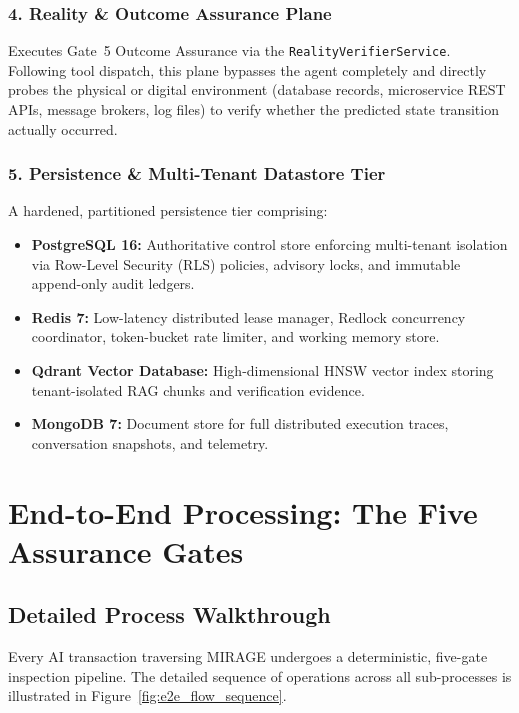 \documentclass[11pt,a4paper]{article}
\begin{document}
\subsubsection{4. Reality \& Outcome Assurance Plane}
Executes Gate~5 Outcome Assurance via the \texttt{RealityVerifierService}. Following tool dispatch, this plane bypasses the agent completely and directly probes the physical or digital environment (database records, microservice REST APIs, message brokers, log files) to verify whether the predicted state transition actually occurred.

\subsubsection{5. Persistence \& Multi-Tenant Datastore Tier}
A hardened, partitioned persistence tier comprising:
\begin{itemize}[leftmargin=*,itemsep=1pt]
  \item \textbf{PostgreSQL 16:} Authoritative control store enforcing multi-tenant isolation via Row-Level Security (RLS) policies, advisory locks, and immutable append-only audit ledgers.
  \item \textbf{Redis 7:} Low-latency distributed lease manager, Redlock concurrency coordinator, token-bucket rate limiter, and working memory store.
  \item \textbf{Qdrant Vector Database:} High-dimensional HNSW vector index storing tenant-isolated RAG chunks and verification evidence.
  \item \textbf{MongoDB 7:} Document store for full distributed execution traces, conversation snapshots, and telemetry.
\end{itemize}

\section{End-to-End Processing: The Five Assurance Gates}

\subsection{Detailed Process Walkthrough}
Every AI transaction traversing MIRAGE undergoes a deterministic, five-gate inspection pipeline. The detailed sequence of operations across all sub-processes is illustrated in Figure~\ref{fig:e2e_flow_sequence}.
\end{document}

